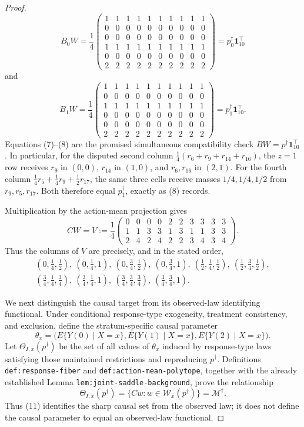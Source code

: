 \documentclass{article}
\begin{document}
\begin{proof}
\[
B_0W=\frac14
\begin{pmatrix}
1&1&1&1&1&1&1&1&1&1\\
0&0&0&0&0&0&0&0&0&0\\
0&0&0&0&0&0&0&0&0&0\\
1&1&1&1&1&1&1&1&1&1\\
0&0&0&0&0&0&0&0&0&0\\
2&2&2&2&2&2&2&2&2&2
\end{pmatrix}
=p_0^\dagger\mathbf 1_{10}^\top
\tag{7}
\]
and
\[
B_1W=\frac14
\begin{pmatrix}
1&1&1&1&1&1&1&1&1&1\\
0&0&0&0&0&0&0&0&0&0\\
1&1&1&1&1&1&1&1&1&1\\
0&0&0&0&0&0&0&0&0&0\\
0&0&0&0&0&0&0&0&0&0\\
2&2&2&2&2&2&2&2&2&2
\end{pmatrix}
=p_1^\dagger\mathbf 1_{10}^\top.
\tag{8}
\]
Equations (7)--(8) are the promised simultaneous compatibility check \(BW=p^\dagger\mathbf 1_{10}^\top\).  In particular, for the disputed second column \(\tfrac14(r_6+r_9+r_{14}+r_{16})\), the \(z=1\) row receives \(r_9\) in \((0,0)\), \(r_{14}\) in \((1,0)\), and \(r_6,r_{16}\) in \((2,1)\).  For the fourth column \(\tfrac14r_5+\tfrac14r_9+\tfrac12r_{17}\), the same three cells receive masses \(1/4,1/4,1/2\) from \(r_9,r_5,r_{17}\).  Both therefore equal \(p_1^\dagger\), exactly as (8) records.

Multiplication by the action-mean projection gives
\[
CW=V:=\frac14
\begin{pmatrix}
0&0&0&0&2&2&3&3&3&3\\
1&1&3&3&1&3&1&1&3&3\\
2&4&2&4&2&2&3&4&3&4
\end{pmatrix}.
\tag{9}
\]
Thus the columns of \(V\) are precisely, and in the stated order,
\[
\begin{gathered}
(0,\tfrac14,\tfrac12),\ (0,\tfrac14,1),\ (0,\tfrac34,\tfrac12),\ (0,\tfrac34,1),\
(\tfrac12,\tfrac14,\tfrac12),\ (\tfrac12,\tfrac34,\tfrac12),\\
(\tfrac34,\tfrac14,\tfrac34),\ (\tfrac34,\tfrac14,1),\
(\tfrac34,\tfrac34,\tfrac34),\ (\tfrac34,\tfrac34,1).
\end{gathered}
\tag{10}
\]

We next distinguish the causal target from its observed-law identifying functional.  Under conditional response-type exogeneity, treatment consistency, and exclusion, define the stratum-specific causal parameter
\[
 \theta_x=\bigl(E\{Y(0)\mid X=x\},E\{Y(1)\mid X=x\},E\{Y(2)\mid X=x\}\bigr).
\]
Let \(\Theta_{I,x}(p^\dagger)\) be the set of all values of \(\theta_x\) induced by response-type laws satisfying those maintained restrictions and reproducing \(p^\dagger\).  Definitions \texttt{def:response-fiber} and \texttt{def:action-mean-polytope}, together with the already established Lemma \texttt{lem:joint-saddle-background}, prove the relationship
\[
 \Theta_{I,x}(p^\dagger)
 =\{Cw:w\in\mathcal W_x(p^\dagger)\}
 =\mathcal M^\dagger.
 \tag{11}
\]
Thus (11) identifies the sharp causal set from the observed law; it does not define the causal parameter to equal an observed-law functional.


\end{proof}
\end{document}
